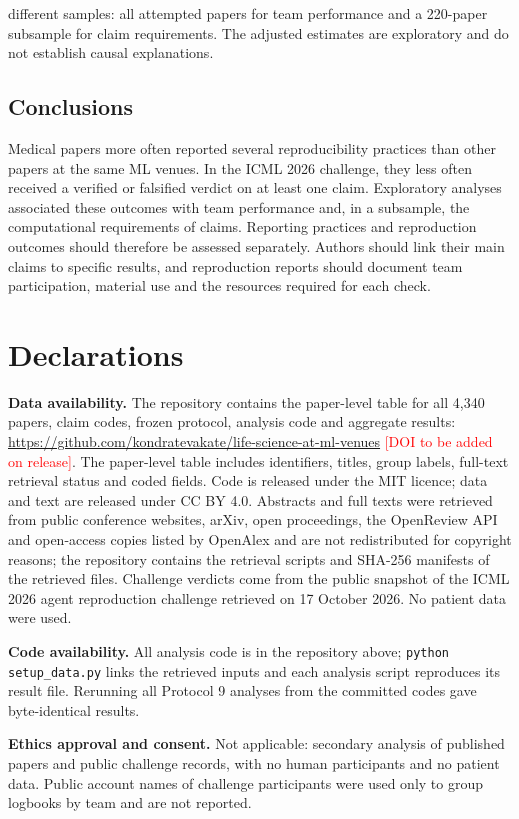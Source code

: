 \documentclass[11pt]{article}
\newcommand{\todo}[1]{\textcolor{red}{#1}}
\begin{document}
different samples: all attempted papers for team performance and a 220-paper subsample for claim requirements. The adjusted estimates are exploratory and do not establish causal explanations.

\subsection*{Conclusions}
Medical papers more often reported several reproducibility practices than other papers at the same ML venues. In the ICML 2026 challenge, they less often received a verified or falsified verdict on at least one claim. Exploratory analyses associated these outcomes with team performance and, in a subsample, the computational requirements of claims. Reporting practices and reproduction outcomes should therefore be assessed separately. Authors should link their main claims to specific results, and reproduction reports should document team participation, material use and the resources required for each check.

\section*{Declarations}
\textbf{Data availability.} The repository contains the paper-level table for all 4,340 papers, claim codes, frozen protocol, analysis code and aggregate results: \url{https://github.com/kondratevakate/life-science-at-ml-venues} \todo{[DOI to be added on release]}. The paper-level table includes identifiers, titles, group labels, full-text retrieval status and coded fields. Code is released under the MIT licence; data and text are released under CC BY 4.0. Abstracts and full texts were retrieved from public conference websites, arXiv, open proceedings, the OpenReview API and open-access copies listed by OpenAlex and are not redistributed for copyright reasons; the repository contains the retrieval scripts and SHA-256 manifests of the retrieved files. Challenge verdicts come from the public snapshot of the ICML 2026 agent reproduction challenge retrieved on 17 October 2026. No patient data were used.

\textbf{Code availability.} All analysis code is in the repository above; \texttt{python setup\_data.py} links the retrieved inputs and each analysis script reproduces its result file. Rerunning all Protocol 9 analyses from the committed codes gave byte-identical results.

\textbf{Ethics approval and consent.} Not applicable: secondary analysis of published papers and public challenge records, with no human participants and no patient data. Public account names of challenge participants were used only to group logbooks by team and are not reported.
\end{document}
